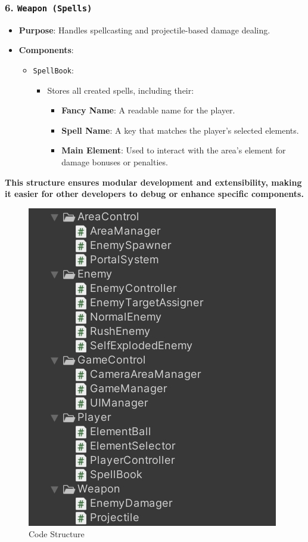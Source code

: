 \documentclass[10pt,twocolumn]{article}
\begin{document}
\subsubsection{6. \texttt{Weapon (Spells)}}
\begin{itemize}
    \item \textbf{Purpose}: Handles spellcasting and projectile-based damage dealing.
    \item \textbf{Components}:
    \begin{itemize}
        \item \texttt{SpellBook}:
        \begin{itemize}
            \item Stores all created spells, including their:
            \begin{itemize}
                \item \textbf{Fancy Name}: A readable name for the player.
                \item \textbf{Spell Name}: A key that matches the player's selected elements.
                \item \textbf{Main Element}: Used to interact with the area's element for damage bonuses or penalties.
            \end{itemize}
        \end{itemize}
    \end{itemize}
\end{itemize}

\textbf{This structure ensures modular development and extensibility, making it easier for other developers to debug or enhance specific components.}

\begin{figure}[h]
    \centering
    \includegraphics[width=\columnwidth]{figure4.png} %
    \caption{Code Structure}
    \label{fig:figure4} %
\end{figure}
\end{document}
